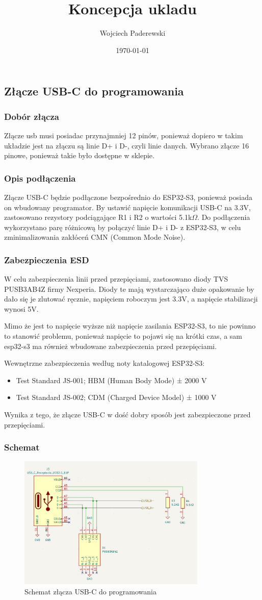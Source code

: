 \documentclass[../../main.tex]{subfiles}
\author{Wojciech Paderewski}
\date{\today}
\title{Koncepcja ukladu}
\begin{document}
\subsection{Złącze USB-C do programowania}
\subsubsection{Dobór złącza}
Złącze usb musi posiadac przynajmniej 12 pinów, ponieważ dopiero w takim układzie jest na złączu są linie D+ i D-, czyli linie danych.
Wybrano złącze 16 pinowe, ponieważ takie było dostępne w sklepie.
\subsubsection{Opis podłączenia}
Złącze USB-C będzie podłączone bezpośrednio do ESP32-S3, ponieważ posiada on wbudowany programator.
By ustawić napięcie komunikacji USB-C na 3.3V, zastosowano rezystory podciągające R1 i R2 o wartości 5.1k$\Omega$.
Do podłączenia wykorzystano parę różnicową by połączyć linie D+ i D- z ESP32-S3, w celu zminimalizowania zakłóceń CMN (Common Mode Noise).
\subsubsection{Zabezpieczenia ESD}
W celu zabezpieczenia linii przed przepięciami, zastosowano diody TVS PUSB3AB4Z firmy Nexperia. Diody te mają wystarczająco duże opakowanie by dało się je zlutować ręcznie, napięciem roboczym jest 3.3V,
a napięcie stabilizacji wynosi 5V.

Mimo że jest to napięcie wyższe niż napięcie zasilania ESP32-S3, to nie powinno to stanowić problemu, 
ponieważ napięcie to pojawi się na krótki czas, a sam esp32-s3 ma również wbudowane zabezpieczenia przed przepięciami.

Wewnętrzne zabezpieczenia według noty katalogowej ESP32-S3:
\begin{itemize}
    \item Test Standard JS-001; HBM (Human Body Mode) ± 2000 V
    \item Test Standard JS-002; CDM (Charged Device Model) ± 1000 V
\end{itemize}
Wynika z tego, że złącze USB-C w dość dobry sposób jest zabezpieczone przed przepięciami.
\subsubsection{Schemat}
\begin{figure}[H]
    \centering
    \includegraphics[width=0.8\textwidth]{usb-c_schemat.png}
    \caption{Schemat złącza USB-C do programowania}
\end{figure}
\end{document}
